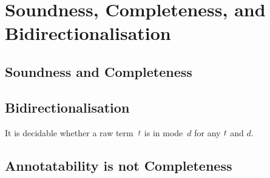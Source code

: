 
\section{Soundness, Completeness, and Bidirectionalisation} \label{sec:annotatability}

\subsection{Soundness and Completeness}


\begin{theorem}[Soundness]\label{thm:term-soundness}
    
\end{theorem}

\begin{theorem}[Completeness]\label{thm:term-completeness}
    
\end{theorem}

\begin{theorem}\label{thm:typing-erasure}
    
\end{theorem}

\subsection{Bidirectionalisation}


\begin{proposition} \label{thm:bidirectionalisation}
  It is decidable whether a raw term~$\isTerm{t}$ is in mode~$d$ for any $\isTerm{t}$ and $d$.
\end{proposition}

\subsection{Annotatability is not Completeness}


